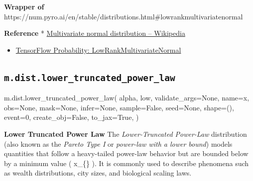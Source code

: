 \documentclass[
  letterpaper,
  DIV=11,
  numbers=noendperiod]{scrartcl}
\newenvironment{Shaded}{\begin{snugshade}}{\end{snugshade}}
\newcommand{\DecValTok}[1]{\textcolor[rgb]{0.68,0.00,0.00}{#1}}
\newcommand{\NormalTok}[1]{\textcolor[rgb]{0.00,0.23,0.31}{#1}}
\newcommand{\OperatorTok}[1]{\textcolor[rgb]{0.37,0.37,0.37}{#1}}
\newcommand{\StringTok}[1]{\textcolor[rgb]{0.13,0.47,0.30}{#1}}
\newcommand{\VariableTok}[1]{\textcolor[rgb]{0.07,0.07,0.07}{#1}}
\providecommand{\tightlist}{%
  \setlength{\itemsep}{0pt}\setlength{\parskip}{0pt}}\usepackage{longtable,booktabs,array}
\begin{document}
\textbf{Wrapper of}
https://num.pyro.ai/en/stable/distributions.html\#lowrankmultivariatenormal

\textbf{Reference} *
\href{https://en.wikipedia.org/wiki/Multivariate_normal_distribution}{Multivariate
normal distribution -- Wikipedia}

\begin{itemize}
\tightlist
\item
  \href{https://www.tensorflow.org/probability/api_docs/python/tfp/distributions/MultivariateNormalDiagPlusLowRank}{TensorFlow
  Probability: LowRankMultivariateNormal}
\end{itemize}

\subsection{\texorpdfstring{\texttt{m.dist.lower\_truncated\_power\_law}}{m.dist.lower\_truncated\_power\_law}}\label{lower_truncated_power_law}

\begin{Shaded}
\begin{Highlighting}[]
\NormalTok{m.dist.lower\_truncated\_power\_law(}
\NormalTok{    alpha,}
\NormalTok{    low,}
\NormalTok{    validate\_args}\OperatorTok{=}\VariableTok{None}\NormalTok{,}
\NormalTok{    name}\OperatorTok{=}\StringTok{\textquotesingle{}x\textquotesingle{}}\NormalTok{,}
\NormalTok{    obs}\OperatorTok{=}\VariableTok{None}\NormalTok{,}
\NormalTok{    mask}\OperatorTok{=}\VariableTok{None}\NormalTok{,}
\NormalTok{    infer}\OperatorTok{=}\VariableTok{None}\NormalTok{,}
\NormalTok{    sample}\OperatorTok{=}\VariableTok{False}\NormalTok{,}
\NormalTok{    seed}\OperatorTok{=}\VariableTok{None}\NormalTok{,}
\NormalTok{    shape}\OperatorTok{=}\NormalTok{(),}
\NormalTok{    event}\OperatorTok{=}\DecValTok{0}\NormalTok{,}
\NormalTok{    create\_obj}\OperatorTok{=}\VariableTok{False}\NormalTok{,}
\NormalTok{    to\_jax}\OperatorTok{=}\VariableTok{True}\NormalTok{,}
\NormalTok{)}
\end{Highlighting}
\end{Shaded}

\textbf{Lower Truncated Power Law} The \emph{Lower-Truncated Power-Law}
distribution (also known as the \emph{Pareto Type I} or \emph{power-law
with a lower bound}) models quantities that follow a heavy-tailed
power-law behavior but are bounded below by a minimum value (
x\_\{\min\} ). It is commonly used to describe phenomena such as wealth
distributions, city sizes, and biological scaling laws.
\end{document}
